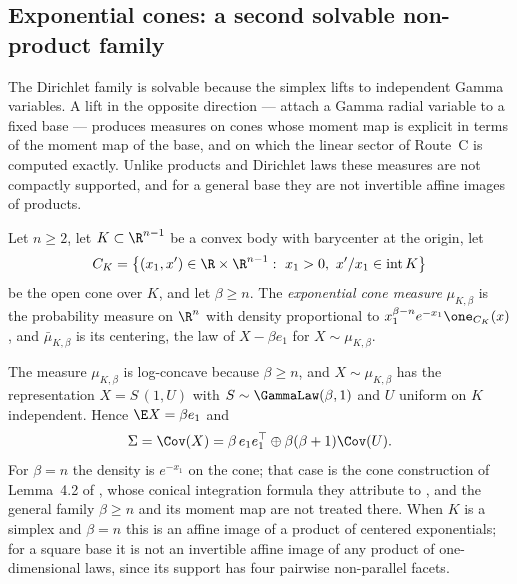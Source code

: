 \documentclass[../../main.tex]{subfiles}
\begin{document}
\subsection{Exponential cones: a second solvable non-product family}
\label{subsec:cmh-cones}

The Dirichlet family is solvable because the simplex lifts to independent Gamma variables. A
lift in the opposite direction --- attach a Gamma radial variable to a fixed base --- produces
measures on cones whose moment map is explicit in terms of the moment map of the base, and on
which the linear sector of Route~C is computed exactly. Unlike products and Dirichlet laws these
measures are not compactly supported, and for a general base they are not invertible affine
images of products.

\begin{definition}
\label{def:exponential-cone}
Let $n\ge2$, let $K\subset\R^{n-1}$ be a convex body with barycenter at the origin, let
\[
  C_K=\bigl\{(x_1,x')\in\R\times\R^{n-1}:\ x_1>0,\ x'/x_1\in\operatorname{int}K\bigr\}
\]
be the open cone over $K$, and let $\beta\ge n$. The \emph{exponential cone measure}
$\mu_{K,\beta}$ is the probability measure on $\R^n$ with density proportional to
$x_1^{\beta-n}e^{-x_1}\one_{C_K}(x)$, and $\bar\mu_{K,\beta}$ is its centering, the law of
$X-\beta e_1$ for $X\sim\mu_{K,\beta}$.
\end{definition}

The measure $\mu_{K,\beta}$ is log-concave because $\beta\ge n$, and $X\sim\mu_{K,\beta}$ has
the representation $X=S\,(1,U)$ with $S\sim\GammaLaw(\beta,1)$ and $U$ uniform on $K$
independent. Hence $\E X=\beta e_1$ and
\begin{equation}
  \Sigma=\Cov(X)=\beta\,e_1e_1^\top\oplus\beta(\beta+1)\Cov(U).
  \label{eq:cone-covariance}
\end{equation}
For $\beta=n$ the density is $e^{-x_1}$ on the cone; that case is the cone construction of
Lemma~4.2 of \cite{ChenKlartag2026SharpThinShell}, whose conical integration formula they
attribute to \cite[Lem.~2.1]{Klartag2018IsotropicMahler}, and the general family $\beta\ge n$
and its moment map are not treated there. When $K$ is a simplex and $\beta=n$ this
is an affine image of a product of centered exponentials; for a square base it is not an
invertible affine image of any product of one-dimensional laws, since its support has four
pairwise non-parallel facets.
\end{document}
